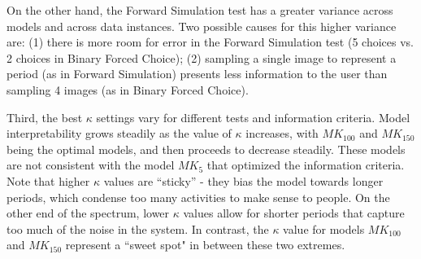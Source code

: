 \documentclass[letterpaper]{article} %
\begin{document}
On the other hand, the Forward Simulation test has a greater variance across models and across data instances. 
Two possible causes for this higher variance are: (1) there is more room for error in the Forward Simulation test (5 choices vs. 2 choices in Binary Forced Choice); (2) sampling a single image to represent a period (as in Forward Simulation) presents less information to the user than sampling 4 images (as in Binary Forced Choice). 

Third, the best $\kappa$ settings vary for different tests and information criteria. 
Model interpretability grows steadily as the value of $\kappa$ increases, with $MK_{100}$ and $MK_{150}$ being the optimal models, and then proceeds to decrease steadily.   
These models are not consistent with the model $MK_5$ that optimized the information criteria.
Note that higher $\kappa$ values are ``sticky'' - they  bias the model towards longer periods, which condense too many activities to make sense to people. 
On the other end of the spectrum, lower $\kappa$ values allow for shorter periods that capture too much of the noise in the system.  
In contrast, the $\kappa$ value for  models $MK_{100}$ and $MK_{150}$ 
represent a ``sweet spot" in between these two extremes.
\end{document}

